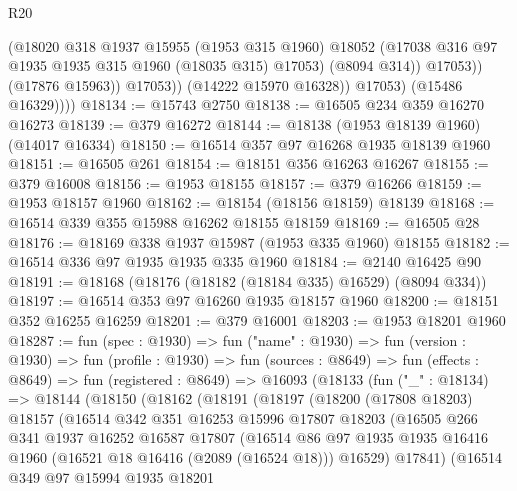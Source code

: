 \begin{lexlean}{R20}
\begin{coremodule}
                        (@18020
                          @318
                          @1937
                          @15955
                          (@1953 @315 @1960)
                          @18052
                          (@17038 @316 @97 @1935 @1935 @315 @1960 (@18035 @315) @17053)
                          (@8094 @314))
                        @17053))
                    (@17876 @15963))
                  @17053))
              (@14222 @15970 @16328))
            @17053)
          (@15486 @16329))))
@18134 := @15743 @2750
@18138 := @16505 @234 @359 @16270 @16273
@18139 := @379 @16272
@18144 := @18138 (@1953 @18139 @1960) (@14017 @16334)
@18150 := @16514 @357 @97 @16268 @1935 @18139 @1960
@18151 := @16505 @261
@18154 := @18151 @356 @16263 @16267
@18155 := @379 @16008
@18156 := @1953 @18155
@18157 := @379 @16266
@18159 := @1953 @18157 @1960
@18162 := @18154 (@18156 @18159) @18139
@18168 := @16514 @339 @355 @15988 @16262 @18155 @18159
@18169 := @16505 @28
@18176 := @18169 @338 @1937 @15987 (@1953 @335 @1960) @18155
@18182 := @16514 @336 @97 @1935 @1935 @335 @1960
@18184 := @2140 @16425 @90
@18191 := @18168 (@18176 (@18182 (@18184 @335) @16529) (@8094 @334))
@18197 := @16514 @353 @97 @16260 @1935 @18157 @1960
@18200 := @18151 @352 @16255 @16259
@18201 := @379 @16001
@18203 := @1953 @18201 @1960
@18287 := fun (spec : @1930) =>
  fun ("name" : @1930) =>
  fun (version : @1930) =>
  fun (profile : @1930) =>
  fun (sources : @8649) =>
  fun (effects : @8649) =>
  fun (registered : @8649) =>
  @16093
    (@18133
      (fun ("_" : @18134) =>
      @18144
        (@18150
          (@18162
            (@18191
              (@18197
                (@18200
                  (@17808 @18203)
                  @18157
                  (@16514
                    @342
                    @351
                    @16253
                    @15996
                    @17807
                    @18203
                    (@16505
                      @266
                      @341
                      @1937
                      @16252
                      @16587
                      @17807
                      (@16514
                        @86
                        @97
                        @1935
                        @1935
                        @16416
                        @1960
                        (@16521 @18 @16416 (@2089 (@16524 @18)))
                        @16529)
                      @17841)
                    (@16514
                      @349
                      @97
                      @15994
                      @1935
                      @18201

\end{coremodule}
\end{lexlean}
